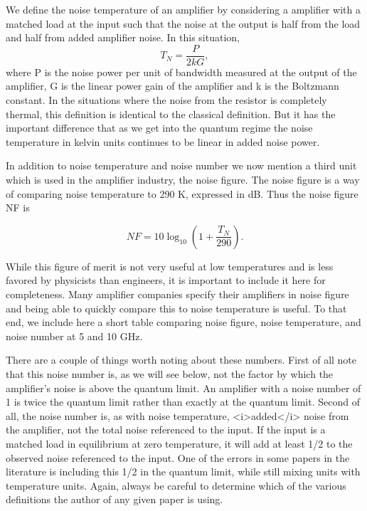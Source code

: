 \documentclass[11pt]{article}
\begin{document}
    	We define the noise temperature of an amplifier by considering a amplifier with a matched load at the input such that the noise at the output is half from the load and half from added amplifier noise.  In this situation, 
$$T_N = \frac{P}{2kG},$$
	where P is the noise power per unit of bandwidth measured at the output of the amplifier, G is the linear power gain of the amplifier and k is the Boltzmann constant.   In the situations where the noise from the resistor is completely thermal, this definition is identical to the classical definition.  But it has the important difference that as we get into the quantum regime the noise temperature in kelvin units continues to be linear in added noise power.  




 
    	In addition to noise temperature and noise number we now mention a third unit which is used in the amplifier industry, the noise figure.  The noise figure is a way of comparing noise temperature to 290 K, expressed in dB.  Thus the noise figure NF is 





    $$NF = 10 \log_{10}{\left(1 + \frac{T_N}{290}\right)}.$$




    While this figure of merit is not very useful at low temperatures and is less favored by physicists than engineers, it is important to include it here for completeness.  Many amplifier companies specify their amplifiers in noise figure and being able to quickly compare this to noise temperature is useful.  To that end, we include here a short table comparing noise figure, noise temperature, and noise number at 5 and 10 GHz.  




    There are a couple of things worth noting about these numbers.  First of all note that this noise number is, as we will see below, not the factor by which the amplifier's noise is above the quantum limit.  An amplifier with a noise number of 1 is twice the quantum limit rather than exactly at the quantum limit.  Second of all, the noise number is, as with noise temperature, <i>added</i> noise from the amplifier, not the total noise referenced to the input.  If the input is a matched load in equilibrium at zero temperature, it will add at least 1/2 to the observed noise referenced to the input.  One of the errors in some papers in the literature is including this 1/2 in the quantum limit, while still mixing units with temperature units.  Again, always be careful to determine which of the various definitions the author of any given paper is using.
\end{document}
